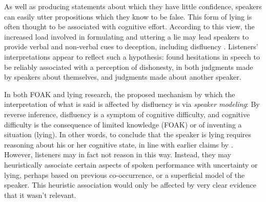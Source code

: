 \documentclass[a4paper,man,natbib]{apa6}
\newcommand*{\term}[1]{\emph{#1}} %
\begin{document}

As well as producing statements about which they have little confidence, speakers can easily utter propositions which they know to be false.
This form of lying \citep[see][for another]{frankfurt05} is often thought to be associated with cognitive effort.
According to this view, the increased load involved in formulating and uttering a lie may lead speakers to provide verbal and non-verbal cues to deception, including disfluency \citep{Zuckerman1981,depaulo2003cues}.
Listeners' interpretations appear to reflect such a hypothesis:
\citet{Zuckerman1981} found hesitations in speech to be reliably associated with a perception of dishonesty, in both judgments made by speakers about themselves, and judgments made about another speaker.

In both FOAK and lying research, the proposed mechanism by which the interpretation of what is said is affected by disfluency is via \term{speaker modeling}:
By reverse inference, disfluency is a symptom of cognitive difficulty, and cognitive difficulty is the consequence of limited knowledge (FOAK) or of inventing a situation (lying).
In other words, to conclude that the speaker is lying requires reasoning about his or her cognitive state, in line with earlier claims by \citet{Arnold2007}.
However, listeners may in fact not reason in this way.
Instead, they may heuristically associate certain aspects of spoken performance with uncertainty or lying, perhaps based on previous co-occurrence, or a superficial model of the speaker.
This heuristic association would only be affected by very clear evidence that it wasn't relevant.
\end{document}

